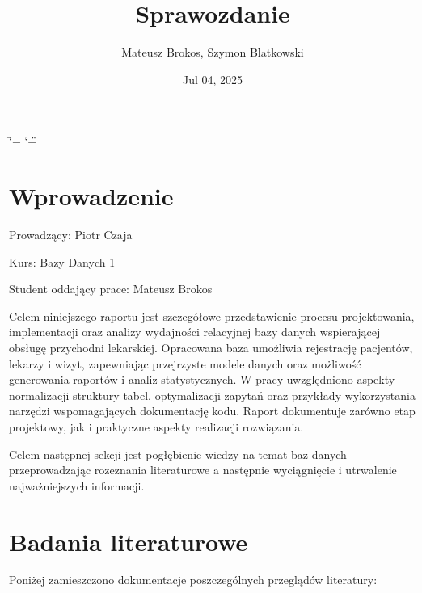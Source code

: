 \documentclass[a4paper,11pt,openany,english]{sphinxmanual}
\title{Sprawozdanie}
\date{Jul 04, 2025}
\author{Mateusz Brokos, Szymon Blatkowski}
\begin{document}
\ifdefined\shorthandoff
  \ifnum\catcode`\=\string=\active\shorthandoff{=}\fi
  \ifnum\catcode`\"=\active{}\fi
\fi

\pagestyle{empty}
\sphinxmaketitle
\pagestyle{plain}
\tableofcontents
\pagestyle{normal}
\label{\detokenize{index::doc}}


\sphinxstepscope


\chapter{Wprowadzenie}
\label{\detokenize{rozdzial1/index:wprowadzenie}}\label{\detokenize{rozdzial1/index::doc}}
\sphinxAtStartPar
Prowadzący: Piotr Czaja

\sphinxAtStartPar
Kurs: Bazy Danych 1

\sphinxAtStartPar
Student oddający prace: Mateusz Brokos

\sphinxAtStartPar
Celem niniejszego raportu jest szczegółowe przedstawienie procesu projektowania, implementacji oraz analizy wydajności relacyjnej bazy danych wspierającej obsługę przychodni lekarskiej. Opracowana baza umożliwia rejestrację pacjentów, lekarzy i wizyt, zapewniając przejrzyste modele danych oraz możliwość generowania raportów i analiz statystycznych. W pracy uwzględniono aspekty normalizacji struktury tabel, optymalizacji zapytań oraz przykłady wykorzystania narzędzi wspomagających dokumentację kodu. Raport dokumentuje zarówno etap projektowy, jak i praktyczne aspekty realizacji rozwiązania.

\sphinxAtStartPar
Celem następnej sekcji jest pogłębienie wiedzy na temat baz danych przeprowadzając rozeznania literaturowe a następnie wyciągnięcie i utrwalenie najważniejszych informacji.

\sphinxstepscope


\chapter{Badania literaturowe}
\label{\detokenize{rozdzial2/index:badania-literaturowe}}\label{\detokenize{rozdzial2/index::doc}}
\sphinxAtStartPar
Poniżej zamieszczono dokumentacje poszczególnych przeglądów literatury:

\sphinxstepscope
\end{document}

